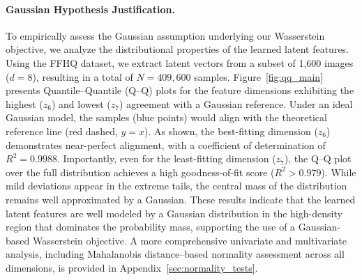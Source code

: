 
\paragraph{Gaussian Hypothesis Justification.} 
To empirically assess the Gaussian assumption underlying our Wasserstein objective, we analyze the distributional properties of the learned latent features. Using the FFHQ dataset, we extract latent vectors from a subset of 1,600 images ($d=8$), resulting in a total of $N=409{,}600$ samples. Figure~\ref{fig:qq_main} presents Quantile--Quantile (Q--Q) plots for the feature dimensions exhibiting the highest ($z_6$) and lowest ($z_7$) agreement with a Gaussian reference. Under an ideal Gaussian model, the samples (blue points) would align with the theoretical reference line (red dashed, $y=x$). As shown, the best-fitting dimension ($z_6$) demonstrates near-perfect alignment, with a coefficient of determination of $R^2 = 0.9988$. Importantly, even for the least-fitting dimension ($z_7$), the Q--Q plot over the full distribution achieves a high goodness-of-fit score ($R^2 > 0.979$). While mild deviations appear in the extreme tails, the central mass of the distribution remains well approximated by a Gaussian. These results indicate that the learned latent features are well modeled by a Gaussian distribution in the high-density region that dominates the probability mass, supporting the use of a Gaussian-based Wasserstein objective. A more comprehensive univariate and multivariate analysis, including Mahalanobis distance–based normality assessment across all dimensions, is provided in Appendix~\ref{sec:normality_tests}.
\vspace{-2ex}

